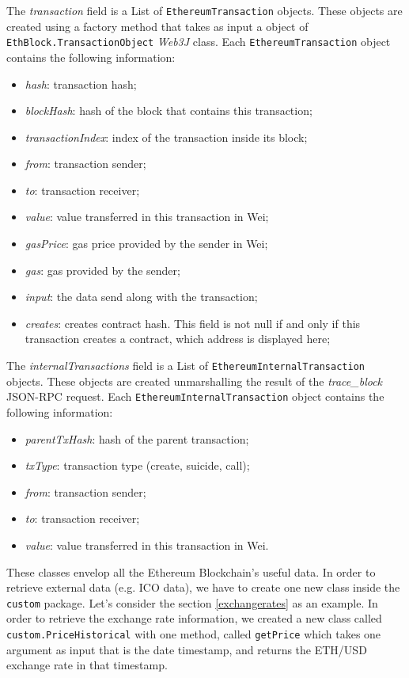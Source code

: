 The \textit{transaction} field is a List of \texttt{EthereumTransaction} objects. These objects are created using a factory method that takes as input a object of \texttt{EthBlock.TransactionObject} \textit{Web3J} class. 
\newline
Each \texttt{EthereumTransaction} object contains the following information:
\begin{itemize}
    \item \textit{hash}: transaction hash;
    \item \textit{blockHash}: hash of the block that contains this transaction;
    \item \textit{transactionIndex}: index of the transaction inside its block;
    \item \textit{from}: transaction sender;
    \item \textit{to}: transaction receiver;
    \item \textit{value}: value transferred in this transaction in Wei;
    \item \textit{gasPrice}: gas price provided by the sender in Wei;
    \item \textit{gas}: gas provided by the sender;
    \item \textit{input}: the data send along with the transaction;
    \item \textit{creates}: creates contract hash. This field is not null if and only if this transaction creates a contract, which address is displayed here;
\end{itemize}
The \textit{internalTransactions} field is a List of \texttt{EthereumInternalTransaction} objects. These objects are created unmarshalling the result of the  \textit{trace\_block} JSON-RPC request. \newline
Each \texttt{EthereumInternalTransaction} object contains the following information:
\begin{itemize}
    \item \textit{parentTxHash}: hash of the parent transaction;
    \item \textit{txType}: transaction type (create, suicide, call);
    \item \textit{from}: transaction sender;
    \item \textit{to}: transaction receiver;
    \item \textit{value}: value transferred in this transaction in Wei.
\end{itemize}

These classes envelop all the Ethereum Blockchain's useful data. In order to retrieve external data (e.g. ICO data), we have to create one new class inside the \texttt{custom} package.
\newline
Let's consider the section \ref{exchangerates} as an example. In order to retrieve the exchange rate information, we created a new class called \texttt{custom.PriceHistorical} with one method, called \texttt{getPrice} which takes one argument as input that is the date timestamp, and returns the ETH/USD exchange rate in that timestamp.

